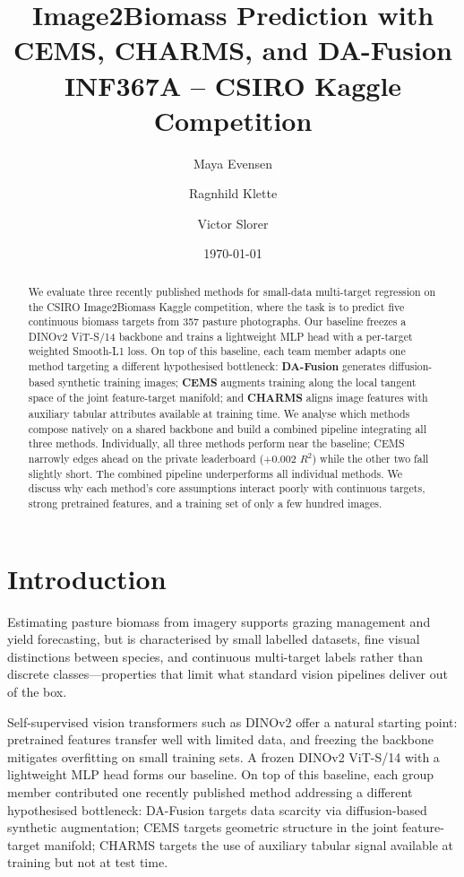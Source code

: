\documentclass[10pt, a4paper]{article}
\title{%
  \textbf{Image2Biomass Prediction with CEMS, CHARMS, and DA-Fusion}\\[0.5em]
  \large INF367A -- CSIRO Kaggle Competition
}
\author{
  Maya Evensen \and Ragnhild Klette \and Victor Slorer
}
\date{\today}
\begin{document}
\maketitle

\begin{abstract}
We evaluate three recently published methods for small-data multi-target
regression on the CSIRO Image2Biomass Kaggle competition, where the task is to
predict five continuous biomass targets from 357 pasture photographs. Our
baseline freezes a DINOv2 ViT-S/14 backbone and trains a lightweight MLP head
with a per-target weighted Smooth-L1 loss. On top of this baseline, each team
member adapts one method targeting a different hypothesised bottleneck:
\textbf{DA-Fusion} \citep{trabucco2024} generates diffusion-based synthetic
training images; \textbf{CEMS} augments training along the local tangent space
of the joint feature-target manifold; and \textbf{CHARMS}
aligns image features with auxiliary tabular attributes available at training
time. We analyse which methods compose natively on a shared backbone and build a
combined pipeline integrating all three methods.
Individually, all three methods perform near the baseline; CEMS narrowly edges
ahead on the private leaderboard ($+0.002$ $R^{2}$) while the other two fall
slightly short. The combined pipeline underperforms all individual methods.
We discuss why each method's core assumptions interact poorly with continuous
targets, strong pretrained features, and a training set of only a few hundred
images.
\end{abstract}

\section{Introduction}

Estimating pasture biomass from imagery supports grazing management and yield
forecasting, but is characterised by small labelled datasets, fine visual
distinctions between species, and continuous multi-target labels rather than
discrete classes---properties that limit what standard vision pipelines deliver
out of the box.

Self-supervised vision transformers such as DINOv2 \citep{oquab2023} offer a
natural starting point: pretrained features transfer well with limited data, and
freezing the backbone mitigates overfitting on small training sets. A frozen
DINOv2 ViT-S/14 with a lightweight MLP head forms our baseline. On top of this
baseline, each group member contributed one recently published method addressing
a different hypothesised bottleneck: DA-Fusion \citep{trabucco2024} targets data
scarcity via diffusion-based synthetic augmentation; CEMS targets geometric
structure in the joint feature-target manifold; CHARMS \citep{jiang2024} targets
the use of auxiliary tabular signal available at training but not at test time.
\end{document}
